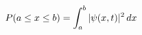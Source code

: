 \documentclass[preview]{standalone}
\begin{document}
\begin{align*}
\special{dvisvgm:raw <g id='unique000'>}P(a \le x \le b) = \int_a^b |\psi(x,t)|^2\,dx\special{dvisvgm:raw </g>}
\end{align*}
\end{document}
